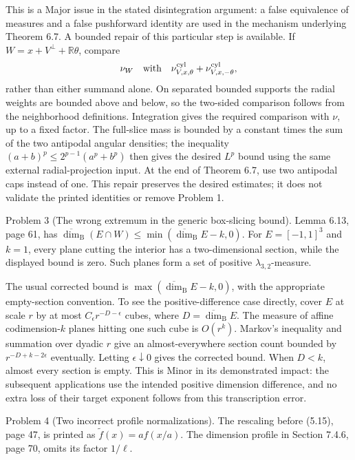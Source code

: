 \documentclass[10pt]{article}
\begin{document}
This is a Major issue in the stated disintegration argument: a false equivalence of measures and a false pushforward identity are used in the mechanism underlying Theorem 6.7. A bounded repair of this particular step is available. If \(W=x+V^\perp+\mathbb R\theta\), compare \[\nu_W\quad\hbox{with}\quad
 \nu^{\mathrm{cyl}}_{V,x,\theta}
 +\nu^{\mathrm{cyl}}_{V,x,-\theta},\] rather than either summand alone. On separated bounded supports the radial weights are bounded above and below, so the two-sided comparison follows from the neighborhood definitions. Integration gives the required comparison with \(\nu\), up to a fixed factor. The full-slice mass is bounded by a constant times the sum of the two antipodal angular densities; the inequality \((a+b)^p\le2^{p-1}(a^p+b^p)\) then gives the desired \(L^p\) bound using the same external radial-projection input. At the end of Theorem 6.7, use two antipodal caps instead of one. This repair preserves the desired estimates; it does not validate the printed identities or remove Problem 1.\par
Problem 3 (The wrong extremum in the generic box-slicing bound).  Lemma 6.13, page 61, has \(\overline{\dim}_{\mathrm B}(E\cap W)\le\min(\overline{\dim}_{\mathrm B}E-k,0)\). For \(E=[-1,1]^3\) and \(k=1\), every plane cutting the interior has a two-dimensional section, while the displayed bound is zero. Such planes form a set of positive \(\lambda_{3,2}\)-measure.\par
The usual corrected bound is \(\max(\overline{\dim}_{\mathrm B}E-k,0)\), with the appropriate empty-section convention. To see the positive-difference case directly, cover \(E\) at scale \(r\) by at most \(C_\epsilon r^{-D-\epsilon}\) cubes, where \(D=\overline{\dim}_{\mathrm B}E\). The measure of affine codimension-\(k\) planes hitting one such cube is \(O(r^k)\). Markov’s inequality and summation over dyadic \(r\) give an almost-everywhere section count bounded by \(r^{-D+k-2\epsilon}\) eventually. Letting \(\epsilon\downarrow0\) gives the corrected bound. When \(D<k\), almost every section is empty. This is Minor in its demonstrated impact: the subsequent applications use the intended positive dimension difference, and no extra loss of their target exponent follows from this transcription error.\par
Problem 4 (Two incorrect profile normalizations).  The rescaling before (5.15), page 47, is printed as \(\widetilde f(x)=a f(x/a)\). The dimension profile in Section 7.4.6, page 70, omits its factor \(1/\ell\).\par
\end{document}
